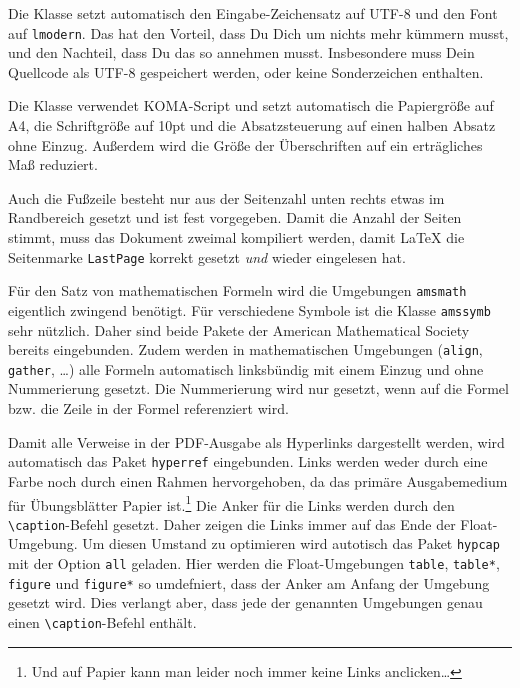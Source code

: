 \documentclass{exercise}
\begin{document}
    Die Klasse setzt automatisch den Eingabe-Zeichensatz auf UTF-8 und den Font
    auf \texttt{lmodern}. Das hat den Vorteil, dass Du Dich um nichts mehr
    kümmern musst, und den Nachteil, dass Du das so annehmen musst. Insbesondere
    muss Dein Quellcode als UTF-8 gespeichert werden, oder keine
    Sonderzeichen enthalten.
    
    Die Klasse verwendet KOMA-Script \cite{koma} und setzt automatisch die
    Papiergröße auf A4, die Schriftgröße auf 10pt und die Absatzsteuerung auf
    einen halben Absatz ohne Einzug. Außerdem wird die Größe der Überschriften
    auf ein erträgliches Maß reduziert.
    
    Auch die Fußzeile besteht nur aus der Seitenzahl unten rechts etwas im
    Randbereich gesetzt und ist fest vorgegeben. Damit die Anzahl der Seiten
    stimmt, muss das Dokument zweimal kompiliert werden, damit \LaTeX{} die
    Seitenmarke \texttt{LastPage} korrekt gesetzt \emph{und} wieder eingelesen hat.
    
    Für den Satz von mathematischen Formeln wird die Umgebungen \texttt{amsmath}
    \cite{amsmath} eigentlich zwingend benötigt. Für verschiedene Symbole ist
    die Klasse \texttt{amssymb} sehr nützlich. Daher sind beide Pakete der
    American Mathematical Society bereits eingebunden. Zudem werden in
    mathematischen Umgebungen (\texttt{align}, \texttt{gather}, \ldots) alle
    Formeln automatisch linksbündig mit einem Einzug und ohne Nummerierung
    gesetzt. Die Nummerierung wird nur gesetzt, wenn auf die Formel bzw. die
    Zeile in der Formel referenziert wird. 
    
    Damit alle Verweise in der PDF-Ausgabe als Hyperlinks dargestellt werden,
    wird automatisch das Paket \texttt{hyperref} \cite{hyperref} eingebunden.
    Links werden weder durch eine Farbe noch durch einen Rahmen hervorgehoben,
    da das primäre Ausgabemedium für Übungsblätter Papier ist.\footnote{Und
    auf Papier kann man leider noch immer keine Links anclicken\ldots} Die
    Anker für die Links werden durch den \lstinline{\caption}-Befehl gesetzt. Daher
    zeigen die Links immer auf das Ende der Float-Umgebung. Um diesen Umstand
    zu optimieren wird autotisch das Paket \texttt{hypcap} \cite{hypcap} mit der
    Option \texttt{all} geladen. Hier werden die Float-Umgebungen \lstinline{table},
    \lstinline{table*}, \lstinline{figure} und \lstinline{figure*} so umdefniert, dass
    der Anker am Anfang der Umgebung gesetzt wird. Dies verlangt aber, dass jede
    der genannten Umgebungen genau einen \lstinline{\caption}-Befehl enthält.
    
\end{document}
